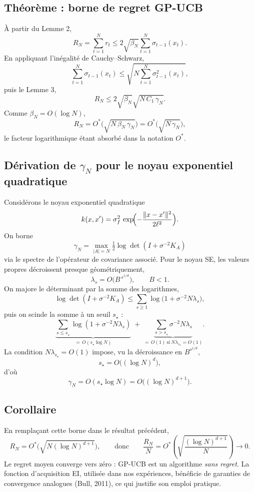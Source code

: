 \documentclass[12pt]{article}
\newcommand{\K}{K}
\begin{document}
\subsection*{Théorème : borne de regret GP-UCB}

À partir du Lemme 2,
\[
R_N = \sum_{t=1}^N r_t \le 2\sqrt{\beta_N}\sum_{t=1}^N \sigma_{t-1}(x_t).
\]
En appliquant l'inégalité de Cauchy--Schwarz,
\[
\sum_{t=1}^N \sigma_{t-1}(x_t) \le \sqrt{N \sum_{t=1}^N \sigma_{t-1}^2(x_t)},
\]
puis le Lemme 3,
\[
R_N \le 2\sqrt{\beta_N}\sqrt{N\,C_1\,\gamma_N}.
\]
Comme $\beta_N = O(\log N)$,
\[
\boxed{\, R_N = O^{*}\!\bigl(\sqrt{N\,\beta_N\,\gamma_N}\bigr) = O^{*}\!\bigl(\sqrt{N\,\gamma_N}\bigr), \,}
\]
le facteur logarithmique étant absorbé dans la notation $O^{*}$.

\subsection*{Dérivation de $\gamma_N$ pour le noyau exponentiel quadratique}

Considérons le noyau exponentiel quadratique
\[
k(x,x') = \sigma_f^2\,\exp\!\Bigl(-\frac{\|x-x'\|^2}{2\ell^2}\Bigr).
\]
On borne
\[
\gamma_N = \max_{|A|=N} \tfrac12\log\det(I + \sigma^{-2}\K_A)
\]
via le spectre de l'opérateur de covariance associé. Pour le noyau SE, les valeurs
propres décroissent presque géométriquement,
\[
\lambda_s = O\!\bigl(B^{\,s^{1/d}}\bigr), \qquad B<1.
\]
On majore le déterminant par la somme des logarithmes,
\[
\log\det(I + \sigma^{-2}\K_A) \le \sum_{s\ge1} \log\bigl(1 + \sigma^{-2} N \lambda_s\bigr),
\]
puis on scinde la somme à un seuil $s_\star$ :
\[
\underbrace{\sum_{s\le s_\star} \log(1 + \sigma^{-2} N \lambda_s)}_{=\,O(s_\star \log N)}
\;+\;
\underbrace{\sum_{s> s_\star} \sigma^{-2} N \lambda_s}_{=\,O(1)\ \text{si}\ N\lambda_{s_\star}=O(1)}.
\]
La condition $N\lambda_{s_\star}=O(1)$ impose, vu la décroissance en $B^{s^{1/d}}$,
\[
s_\star = O\!\bigl((\log N)^d\bigr),
\]
d'où
\[
\boxed{\, \gamma_N = O(s_\star \log N) = O\!\bigl((\log N)^{d+1}\bigr). \,}
\]

\subsection*{Corollaire}

En remplaçant cette borne dans le résultat précédent,
\[
R_N = O^{*}\!\bigl(\sqrt{N (\log N)^{d+1}}\bigr),
\qquad\text{donc}\qquad
\frac{R_N}{N} = O^{*}\!\left(\sqrt{\frac{(\log N)^{d+1}}{N}}\right) \longrightarrow 0.
\]
Le regret moyen converge vers zéro : GP-UCB est un algorithme \emph{sans regret}.
La fonction d'acquisition EI, utilisée dans nos expériences, bénéficie de
garanties de convergence analogues (Bull, 2011), ce qui justifie son emploi
pratique.
\end{document}
